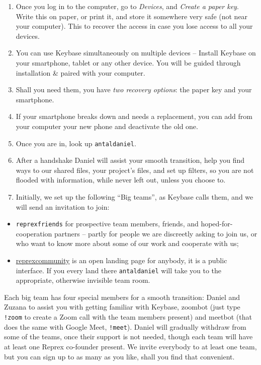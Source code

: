 \documentclass[
  a4paper,
  openany, a4paper, oneside]{book}
\providecommand{\tightlist}{%
  \setlength{\itemsep}{0pt}\setlength{\parskip}{0pt}}
\begin{document}
\begin{enumerate}
\def\labelenumi{\arabic{enumi}.}
\setcounter{enumi}{1}
\item
  Once you log in to the computer, go to \emph{Devices}, and \emph{Create a paper key}. Write this on paper, or print it, and store it somewhere very safe (not near your computer). This to recover the access in case you lose access to all your devices.
\item
  You can use Keybase simultaneously on multiple devices -- Install Keybase on your smartphone, tablet or any other device. You will be guided through installation \& paired with your computer.
\item
  Shall you need them, you have \emph{two recovery options}: the paper key and your smartphone.
\item
  If your smartphone breaks down and needs a replacement, you can add from your computer your new phone and deactivate the old one.
\item
  Once you are in, look up \texttt{antaldaniel}.
\item
  After a handshake Daniel will assist your smooth transition, help you find ways to our shared files, your project's files, and set up filters, so you are not flooded with information, while never left out, unless you choose to.
\item
  Initially, we set up the following ``Big teams'', as Keybase calls them, and we will send an invitation to join:
\end{enumerate}

\begin{itemize}
\tightlist
\item
  \texttt{reprexfriends} for prospective team members, friends, and hoped-for-cooperation partners -- partly for people we are discreetly asking to join us, or who want to know more about some of our work and cooperate with us;
\item
  \href{https://keybase.io/team/reprexcommunity}{reprexcommunity} is an open landing page for anybody, it is a public interface. If you every land there \texttt{antaldaniel} will take you to the appropriate, otherwise invisible team room.
\end{itemize}

Each big team has four special members for a smooth transition: Daniel and Zuzana to assist you with getting familiar with Keybase, zoombot (just type \texttt{!zoom} to create a Zoom call with the team members present) and meetbot (that does the same with Google Meet, \texttt{!meet}). Daniel will gradually withdraw from some of the teams, once their support is not needed, though each team will have at least one Reprex co-founder present. We invite everybody to at least one team, but you can sign up to as many as you like, shall you find that convenient.
\end{document}
